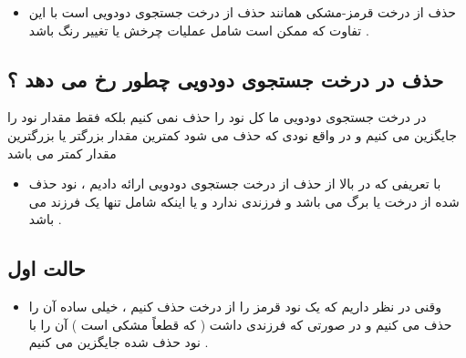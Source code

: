 \documentclass[12pt]{article}
\begin{document}
\begin{tcolorbox}
\begin{itemize}
	\item حذف از درخت قرمز-مشکی همانند حذف از درخت جستجوی دودویی است با این تفاوت که ممکن است شامل عملیات چرخش یا تغییر رنگ باشد .
\end{itemize}
\end{tcolorbox}



\subsection{حذف در درخت جستجوی دودویی چطور رخ می دهد ؟}


در درخت جستجوی دودویی ما کل نود را حذف نمی کنیم بلکه فقط مقدار نود را جایگزین می کنیم و در واقع نودی که حذف می شود کمترین مقدار بزرگتر یا بزرگترین مقدار کمتر می باشد 




\begin{tcolorbox}
\begin{itemize}
	\item با تعریفی که در بالا از حذف از درخت جستجوی دودویی ارائه دادیم ، نود حذف شده از درخت یا برگ می باشد و فرزندی ندارد و یا اینکه شامل تنها یک فرزند می باشد .
\end{itemize}
\end{tcolorbox}











\subsection{حالت اول}





\begin{tcolorbox}
\begin{itemize}
	\item وقنی در نظر داریم که یک نود قرمز را از درخت حذف کنیم ، 
	خیلی ساده آن را حذف می کنیم و در صورتی که فرزندی داشت ( که قطعاً مشکی است ) آن را با نود حذف شده جایگزین می کنیم .
\end{itemize}
\end{tcolorbox}
\end{document}
